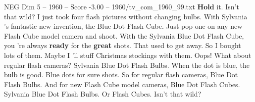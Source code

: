 \begin{textsample}{NEG Dim 5 – 1960 – Score -3.00 – 1960/tv\_com\_1960\_99.txt}  \label{ex:f5_neg_007}
\textbf{Hold} it.
Isn't that wild?
I just took four flash pictures without changing bulbs.
With Sylvania 's fantastic new invention, the Blue Dot Flash Cube.
Just pop one on any new Flash Cube model camera and shoot.
With the Sylvania Blue Dot Flash Cube, you 're always \textbf{ready} for the \textbf{great} shots.
That used to get away.
So I bought lots of them.
Maybe I 'll stuff Christmas stockings with them.
Oops!
What about regular flash cameras?
Sylvania Blue Dot Flash Bulbs.
When the dot is blue, the bulb is good.
Blue dots for sure shots.
So for regular flash cameras, Blue Dot Flash Bulbs.
And for new Flash Cube model cameras, Blue Dot Flash Cubes.
Sylvania Blue Dot Flash Bulbs.
Or Flash Cubes.
Isn't that wild?

\end{textsample}
